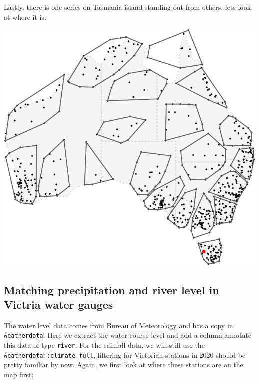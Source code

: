 \documentclass[
]{jss}
\begin{document}
Lastly, there is one series on Tasmania island standing out from others,
lets look at where it is:

\begin{CodeChunk}


\begin{center}\includegraphics{figures/unnamed-chunk-17-1} \end{center}

\end{CodeChunk}

\hypertarget{matching-precipitation-and-river-level-in-victria-water-gauges}{%
\subsection{Matching precipitation and river level in Victria water
gauges}\label{matching-precipitation-and-river-level-in-victria-water-gauges}}

The water level data comes from
\href{http://www.bom.gov.au/metadata/catalogue/19115/ANZCW0503900528?template=full}{Bureau
of Meteorology} and has a copy in \texttt{weatherdata}. Here we extract
the water course level and add a column annotate this data of type
\texttt{river}. For the rainfall data, we will still use the
\texttt{weatherdata::climate\_full}, filtering for Victorian stations in
2020 should be pretty familiar by now. Again, we first look at where
these stations are on the map first:
\end{document}

